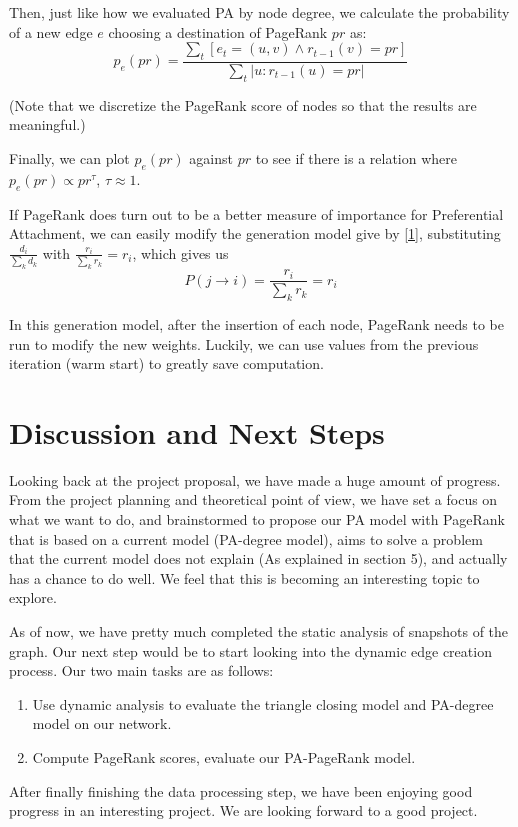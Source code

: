 \documentclass[10pt]{article}
\begin{document}
\begin{multicols}{2}
Then, just like how we evaluated PA by node degree, we calculate the probability of a new edge $e$ choosing a destination of PageRank $pr$ as:
\begin{equation}
\label{4}
p_e(pr)=\frac{\sum\limits_{t}[e_t=(u,v)\wedge r_{t-1}(v)=pr]}{\sum\limits_{t}|u:r_{t-1}(u)=pr|}
\end{equation}

(Note that we discretize the PageRank score of nodes so that the results are meaningful.)

Finally, we can plot $p_e(pr)$ against $pr$ to see if there is a relation where $p_e(pr)\propto pr^\tau$, $\tau \approx 1$.

If PageRank does turn out to be a better measure of importance for Preferential Attachment, we can easily modify the generation model give by \eqref{1}, substituting $\frac{d_i}{\sum\limits_{k}d_k}$ with $\frac{r_i}{\sum\limits_{k}r_k}=r_i$, which gives us
\begin{equation}
\label{5}
P(j\rightarrow i)=\frac{r_i}{\sum\limits_{k}r_k}=r_i
\end{equation}

In this generation model, after the insertion of each node, PageRank needs to be run to modify the new weights. Luckily, we can use values from the previous iteration (warm start) to greatly save computation.


\section{Discussion and Next Steps} 
\vspace{10pt}
Looking back at the project proposal, we have made a huge amount of progress. From the project planning and theoretical point of view, we have set a focus on what we want to do, and brainstormed to propose our PA model with PageRank that is based on a current model (PA-degree model), aims to solve a problem that the current model does not explain (As explained in section 5), and actually has a chance to do well. We feel that this is becoming an interesting topic to explore.

As of now, we have pretty much completed the static analysis of snapshots of the graph. Our next step would be to start looking into the dynamic edge creation process. Our two main tasks are as follows: 
\begin{enumerate}
\item Use dynamic analysis to evaluate the triangle closing model and PA-degree model on our network.
\item Compute PageRank scores, evaluate our PA-PageRank model.
\end{enumerate}

After finally finishing the data processing step, we have been enjoying good progress in an interesting project. We are looking forward to a good project.




\end{multicols}
\end{document}
